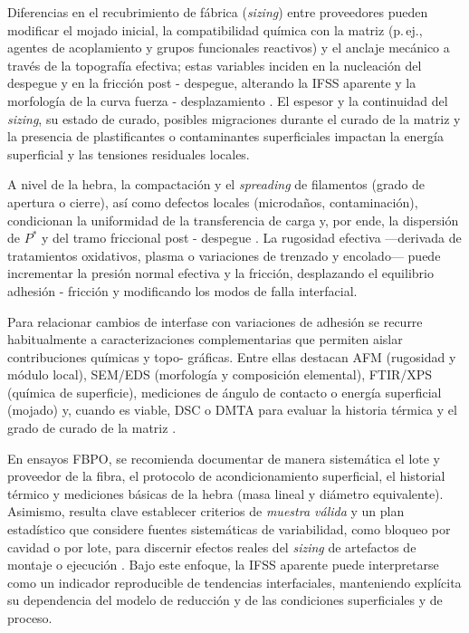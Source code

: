 Diferencias en el recubrimiento de fábrica (\textit{sizing}) entre proveedores pueden modificar el
mojado inicial, la compatibilidad química con la matriz (p.\,ej., agentes de acoplamiento y grupos
funcionales reactivos) y el anclaje mecánico a través de la topografía efectiva; estas variables
inciden en la nucleación del despegue y en la fricción post - despegue, alterando la IFSS aparente y la
morfología de la curva fuerza - desplazamiento \cite{AhmadvashAghbash2024IMR,Liu2021}. El espesor y la
continuidad del \textit{sizing}, su estado de curado, posibles migraciones durante el curado de la
matriz y la presencia de plastificantes o contaminantes superficiales impactan la energía superficial
y las tensiones residuales locales.

A nivel de la hebra, la compactación y el \emph{spreading} de filamentos (grado de apertura o cierre),
así como defectos locales (microdaños, contaminación), condicionan la uniformidad de la transferencia
de carga y, por ende, la dispersión de \(P^{\ast}\) y del tramo friccional post - despegue
\cite{Fischer2020}. La rugosidad efectiva —derivada de tratamientos oxidativos, plasma o variaciones
de trenzado y encolado— puede incrementar la presión normal efectiva y la fricción, desplazando el
equilibrio adhesión - fricción y modificando los modos de falla interfacial.

Para relacionar cambios de interfase con variaciones de adhesión se recurre habitualmente a
caracterizaciones complementarias que permiten aislar contribuciones químicas y topo- gráficas. Entre
ellas destacan AFM (rugosidad y módulo local), SEM/EDS (morfología y composición elemental),
FTIR/XPS (química de superficie), mediciones de ángulo de contacto o energía superficial (mojado) y,
cuando es viable, DSC o DMTA para evaluar la historia térmica y el grado de curado de la matriz
\cite{AhmadvashAghbash2024IMR,Liu2021}.

En ensayos FBPO, se recomienda documentar de manera sistemática el lote y proveedor de la fibra, el
protocolo de acondicionamiento superficial, el historial térmico y mediciones básicas de la hebra
(masa lineal y diámetro equivalente). Asimismo, resulta clave establecer criterios de
\emph{muestra válida} y un plan estadístico que considere fuentes sistemáticas de variabilidad, como
bloqueo por cavidad o por lote, para discernir efectos reales del \textit{sizing} de artefactos de
montaje o ejecución \cite{Fischer2020,ISO19375}. Bajo este enfoque, la IFSS aparente puede
interpretarse como un indicador reproducible de tendencias interfaciales, manteniendo explícita su
dependencia del modelo de reducción y de las condiciones superficiales y de proceso.

